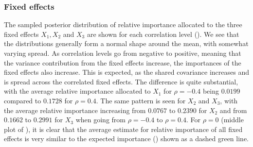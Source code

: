 \subsubsection{Fixed effects}
The sampled posterior distribution of relative importance allocated to the three fixed effects $X_1, X_2$ and $X_3$ are shown for each correlation level (). We see that the distributions generally form a normal shape around the mean, with somewhat varying spread. As correlation levels go from negative to positive, meaning that the variance contribution from the fixed effects increase, the importances of the fixed effects also increase. This is expected, as the shared covariance increases and is spread across the correlated fixed effects. The difference is quite substantial, with the average relative importance allocated to $X_1$ for $\rho=-0.4$ being $0.0199$ compared to $0.1728$ for $\rho=0.4$. The same pattern is seen for $X_2$ and $X_3$, with the average relative importance increasing from $0.0767$ to $0.2390$ for $X_2$ and from $0.1662$ to $0.2991$ for $X_3$ when going from $\rho=-0.4$ to $\rho=0.4$. For $\rho=0$ (middle plot of ), it is clear that the average estimate for relative importance of all fixed effects is very similar to the expected importance () shown as a dashed green line. 
\\
\\
